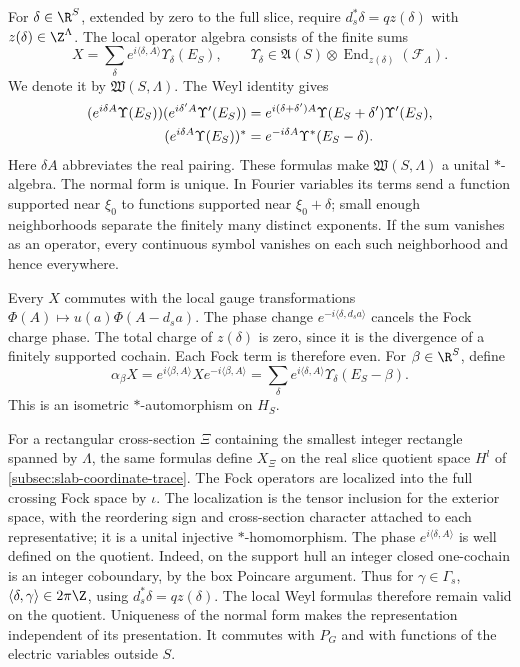 For $\delta\in\R^S$, extended by zero to the full slice, require
$d_s^*\delta=qz(\delta)$ with $z(\delta)\in\Z^\Lambda$. The local
operator algebra consists of the finite sums
\begin{equation}\label{eq:diag-operator-normal-form}
 X=\sum_\delta e^{i\langle\delta,A\rangle}\Upsilon_\delta(E_S),
 \qquad\Upsilon_\delta\in\mathfrak A(S)\otimes
                      \operatorname{End}_{z(\delta)}(\mathcal F_\Lambda).
\end{equation}
We denote it by $\mathfrak W(S,\Lambda)$. The Weyl identity gives
\begin{align}\label{eq:diag-operator-rules}
 (e^{i\delta A}\Upsilon(E_S))(e^{i\delta'A}\Upsilon'(E_S))
       &=e^{i(\delta+\delta')A}\Upsilon(E_S+\delta')\Upsilon'(E_S),
          \notag\\
 (e^{i\delta A}\Upsilon(E_S))^*
       &=e^{-i\delta A}\Upsilon^*(E_S-\delta).
\end{align}
Here $\delta A$ abbreviates the real pairing. These formulas make
$\mathfrak W(S,\Lambda)$ a unital $*$-algebra. The normal form is
unique. In Fourier variables its terms send a function supported
near $\xi_0$ to functions supported near $\xi_0+\delta$; small
enough neighborhoods separate the finitely many distinct exponents.
If the sum vanishes as an operator, every continuous symbol vanishes
on each such neighborhood and hence everywhere.

Every $X$ commutes with the local gauge transformations
$\Phi(A)\mapsto u(a)\Phi(A-d_sa)$. The phase change
$e^{-i\langle\delta,d_sa\rangle}$ cancels the Fock charge phase.
The total charge of $z(\delta)$ is zero, since it is the divergence
of a finitely supported cochain. Each Fock term is therefore even.
For $\beta\in\R^S$, define
\begin{equation}\label{eq:diag-alpha}
 \alpha_\beta X=e^{i\langle\beta,A\rangle}Xe^{-i\langle\beta,A\rangle}
    =\sum_\delta e^{i\langle\delta,A\rangle}
                                      \Upsilon_\delta(E_S-\beta).
\end{equation}
This is an isometric $*$-automorphism on $H_S$.

For a rectangular cross-section $\Xi$ containing the smallest integer
rectangle spanned by $\Lambda$,
the same formulas define $X_\Xi$ on the real slice quotient space
$H^l$ of \cref{subsec:slab-coordinate-trace}. The Fock operators
are localized into the full crossing Fock space by $\iota$.
The localization is the tensor inclusion for the exterior space, with the reordering
sign and cross-section character attached to each representative;
it is a unital injective $*$-homomorphism. The phase
$e^{i\langle\delta,A\rangle}$ is well defined on the quotient.
Indeed, on the support hull an integer closed one-cochain is an
integer coboundary, by the box Poincare argument. Thus for
$\gamma\in\Gamma_s$,
$\langle\delta,\gamma\rangle\in2\pi\Z$, using
$d_s^*\delta=qz(\delta)$. The local Weyl formulas therefore remain
valid on the quotient. Uniqueness of the normal form makes the
representation independent of its presentation. It commutes with
$P_G$ and with functions of the electric variables outside $S$.


